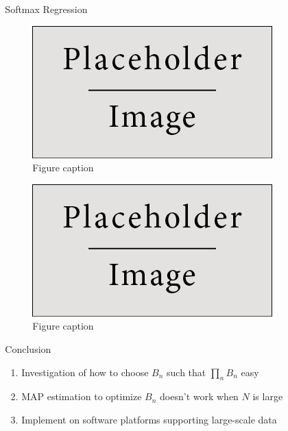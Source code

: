 \documentclass[final]{beamer}
\newlength{\sepwid}
\newlength{\onecolwid}
\newlength{\twocolwid}
\begin{document}
\begin{frame}[t]
\begin{columns}[t]
\begin{column}{\twocolwid}
\end{column} %

\begin{column}{\sepwid}\end{column} %

\begin{column}{\onecolwid} %

\begin{block}{Softmax Regression}

\begin{figure}
\includegraphics[width=0.8\linewidth]{placeholder.jpg}
\caption{Figure caption}
\end{figure}

\begin{figure}
\includegraphics[width=0.8\linewidth]{placeholder.jpg}
\caption{Figure caption}
\end{figure}

\end{block}



\begin{block}{Conclusion}

\begin{enumerate}
  \item Investigation of how to choose $B_n$ such that $\prod_n B_n$ easy
  \item MAP estimation to optimize $B_n$ doesn't work when $N$ is large
  \item Implement on software platforms supporting large-scale data
\end{enumerate}


\end{block}
\end{column}
\end{columns}
\end{frame}
\end{document}
